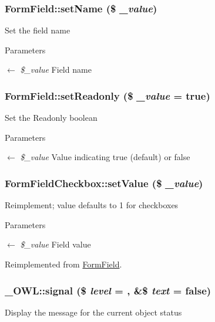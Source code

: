 \subsubsection[{setName}]{\setlength{\rightskip}{0pt plus 5cm}FormField::setName (\$ {\em \_\-value})}\label{classFormField_ad57e32bd53170af060e869b3b60f0ef7}
Set the field name 
\begin{DoxyParams}{Parameters}
\item[\mbox{$\leftarrow$} {\em \$\_\-value}]Field name \end{DoxyParams}
\subsubsection[{setReadonly}]{\setlength{\rightskip}{0pt plus 5cm}FormField::setReadonly (\$ {\em \_\-value} = {\ttfamily true})}\label{classFormField_a6eabbb35d24b1698ea25b66ddfd88a64}
Set the Readonly boolean 
\begin{DoxyParams}{Parameters}
\item[\mbox{$\leftarrow$} {\em \$\_\-value}]Value indicating true (default) or false \end{DoxyParams}
\subsubsection[{setValue}]{\setlength{\rightskip}{0pt plus 5cm}FormFieldCheckbox::setValue (\$ {\em \_\-value})}\label{classFormFieldCheckbox_a787abee157599c389a18e0810f69fed5}
Reimplement; value defaults to 1 for checkboxes 
\begin{DoxyParams}{Parameters}
\item[\mbox{$\leftarrow$} {\em \$\_\-value}]Field value \end{DoxyParams}


Reimplemented from \hyperlink{classFormField_a465ff61e290d82be96bb793c3a14b3e7}{FormField}.

\subsubsection[{signal}]{\setlength{\rightskip}{0pt plus 5cm}\_\-OWL::signal (\$ {\em level} = {}, \/  \&\$ {\em text} = {\ttfamily false})}\label{class__OWL_a51ba4a16409acf2a2f61f286939091a5}
Display the message for the current object status


